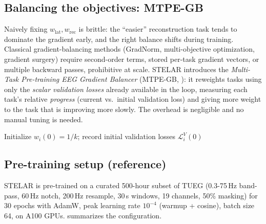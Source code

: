 \documentclass[11pt]{article}
\newcommand{\wlat}{w_{\mathrm{lat}}}
\newcommand{\wrec}{w_{\mathrm{rec}}}
\begin{document}
\subsection{Balancing the objectives: MTPE-GB}
Naively fixing \(\wlat,\wrec\) is brittle: the ``easier'' reconstruction task
tends to dominate the gradient early, and the right balance shifts during
training. Classical gradient-balancing methods (GradNorm,
multi-objective optimization, gradient
surgery) require second-order terms, stored per-task gradient
vectors, or multiple backward passes, prohibitive at scale. STELAR introduces
the \emph{Multi-Task Pre-training EEG Gradient Balancer} (MTPE-GB,
): it reweights tasks using only the \emph{scalar validation
losses} already available in the loop, measuring each task's relative
\emph{progress} (current vs.\ initial validation loss) and giving more weight to
the task that is improving more slowly. The overhead is negligible and no manual
tuning is needed.

\begin{algorithm}[t]
\caption{MTPE-GB: validation-driven task balancing}
\label{alg:mtpegb}
Initialize $w_i(0)=1/k$; record initial validation losses $\mathcal{L}^{V}_i(0)$\;
\end{algorithm}

\subsection{Pre-training setup (reference)}
STELAR is pre-trained on a curated 500-hour subset of TUEG
(0.3-75\,Hz band-pass, 60\,Hz notch, 200\,Hz resample, 30\,s windows, 19
channels, 50\% masking) for 30 epochs with AdamW, peak learning rate
\(10^{-4}\) (warmup + cosine), batch size 64, on A100 GPUs.
 summarizes the configuration.
\end{document}
